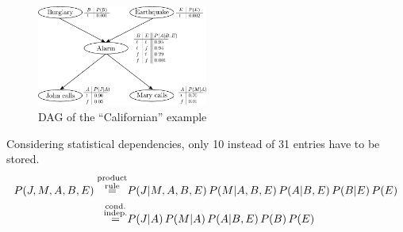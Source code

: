 \begin{frame} \frametitle{\subsubsecname}

	\begin{figure}[h]
		 \centering
		 \includegraphics[width=0.5\textwidth]{img/section3_fig5_v2_2}%
		 \caption{DAG of the ``Californian'' example}
	\end{figure}
	
Considering statistical dependencies, only 10 instead of 31 entries have to be stored.
	{ \small
		\begin{align} 
			P(J,M,A,B,E) \stackrel{\substack{\text{product}\\\text{rule}}}{=}& 
			P(J|M,A,B,E) \, P(M|A,B,E) \, P(A|B,E) \, P(B|E) \, P(E) \\\slidesonly{\vspace{-5mm}}
			\stackrel{\substack{\text{cond.}\\\text{indep.}}}{=}& P(J|A) \, P(M|A) \, P(A|B,E) \, P(B) \, P(E)
		\end{align}
	}
\end{frame}

